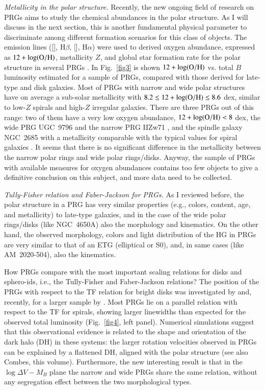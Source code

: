 \documentclass[11pt,twoside]{article}
\begin{document}
{\it Metallicity in the polar structure.\/} Recently, the new ongoing
field of research on PRGs aims to study the chemical abundances in the
polar structure. As I will discuss in the next section, this is
another fundamental physical parameter to discriminate among different
formation scenarios for this class of objects.  The emission lines
([], H$\beta$, [], H$\alpha$) were used to
derived oxygen abundance, expressed as $12+\log({\rm O/H})$,
metallicity $Z$, and global star formation rate for the polar
structure in several PRGs \citep[][and Moiseev et al., this
volume]{EP1997, Per09, Spavone2010, Spavone2012, Freitas, SI2013}. In
Fig.~\ref{fig3} is shown $12+\log({\rm O/H})$ vs. total $B$ luminosity
estimated for a sample of PRGs, compared with those derived for
late-type and disk galaxies. Most of PRGs with narrow and wide polar
structures have on average a sub-solar metallicity with $8.2 \le
12+\log({\rm O/H}) \le 8.6$ dex, similar to low-$Z$ spirals and
high-$Z$ irregular galaxies. There are three PRGs out of this range:
two of them have a very low oxygen abundance, $12+\log({\rm O/H}) < 8$
dex, the wide PRG UGC~9796 and the narrow PRG
IIZw71 \citep{Spavone2012, Per09}, and the spindle galaxy NGC~2685
with a metallicity comparable with the typical values for spiral
galaxies \citep{EP1997}.  It seems that there is no significant
difference in the metallicity between the narrow polar rings and wide
polar rings/disks. Anyway, the sample of PRGs with available measures
for oxygen abundances contains too few objects to give a definitive
conclusion on this subject, and more data need to be collected.

{\it Tully-Fisher relation and Faber-Jackson for PRGs.\/} As I
reviewed before, the polar structure in a PRG has very similar
properties (e.g., colors,  content, age, and metallicity) to
late-type galaxies, and in the case of the wide polar rings/disks
(like NGC~4650A) also the morphology and kinematics. On the other
hand, the observed morphology, colors and light distribution of the HG
in PRGs are very similar to that of an ETG (elliptical or S0), and, in
same cases (like AM~2020-504), also the kinematics.

How PRGs compare with the most important scaling relations for disks
and sphe\-ro-ids, i.e., the Tully-Fisher \citep[TF;][]{TF} and
Faber-Jackson \citep[FJ;][]{FJ} relations?  The position of the PRGs
with respect to the TF relation for bright disks was investigated
by \citet{Iodice2003} and, recently, for a larger sample
by \citet{Combes2013}. Most PRGs lie on a parallel relation with
respect to the TF for spirals, showing larger  linewidths
than expected for the observed total luminosity (Fig.~\ref{fig4}, left
panel). Numerical simulations suggest that this observational evidence
is related to the shape and orientation of the dark halo (DH) in these
systems: the larger rotation velocities observed in PRGs can be
explained by a flattened DH, aligned with the polar structure (see
also Combes, this volume). Furthermore, the new interesting result is
that in the $\log{\Delta V}-M_B$ plane the narrow and wide PRGs share
the same relation, without any segregation effect between the two
morphological types.
\end{document}
